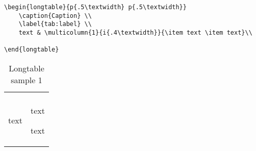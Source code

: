 \documentclass[12pt]{article}
\begin{document}
\begin{lstlisting}
\begin{longtable}{p{.5\textwidth} p{.5\textwidth}}
	\caption{Caption} \\
	\label{tab:label} \\
	text & \multicolumn{1}{i{.4\textwidth}}{\item text \item text}\\

\end{longtable}
\end{lstlisting}
\begin{longtable}{p{} p{}}
	\caption{Longtable sample 1} \\
	\label{tab:label} \\
	text & \multicolumn{1}{i{.4\textwidth}}{\item text \item text}\\

\end{longtable}
\end{document}
